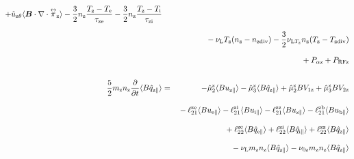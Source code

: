 \documentclass[11pt]{article}
\def\bvec#1{\leavevmode\hbox{\boldmath$#1$}}
\let\vec=\bvec
\def\r#1{{\rm#1}}
\def\aves#1{\langle#1\rangle}
\def\tensor#1{\mathord{\displaystyle\mathop{#1}^\leftrightarrow}}
\def\para{\parallel}
\def\ddt{\frac{\partial}{\partial t}}
\def\mz{m_\r{z}}
\def\nz{n_\r{z}}
\def\Te{T_\r{e}}
\def\Ti{T_\r{i}}
\def\Tz{T_\r{z}}
\def\upara#1{u_{\r{#1}\para}}
\def\uhatth#1{\hat{u}_{\r{#1}\theta}}
\def\qhatpara#1{\hat{q}_{\r{#1}\para}}
\def\nun#1{\nu_\r{0#1}}
\def\ndiv#1{n_\r{#1div}}
\def\Tdiv#1{T_\r{#1div}}
\def\nuLT#1{\nu_{\r{L}T_\r{#1}}}
\def\PRF#1{P_\r{RF#1}}
\def\Palp#1{P_{\alpha\r{#1}}}
\def\nuL{\nu_\r{L}}
\begin{document}
\begin{eqnarray}
%
  + \uhatth{z} \aves{\vec{B}\cdot\nabla\cdot\tensor{\pi}_\r{z}}
%
  - \frac{3}{2} \nz \frac{ \Tz - \Te }{\tau_\r{ze}}
  - \frac{3}{2} \nz \frac{ \Tz - \Ti }{\tau_\r{zi}}
\nonumber\\[2.5mm]&&{}
%
  - \nuL \Tz (\nz - \ndiv{z})
%
  - \frac{3}{2} \nuLT{z} \nz (\Tz - \Tdiv{z})
\nonumber\\[2.5mm]&&{}
%
  + \Palp{z}
%
  + \PRF{z}
\\[5mm]
 \frac{5}{2} \mz \nz \ddt \aves{B \qhatpara{z}} &=&
%
  - \hat{\mu}_2^\r{z} \aves{B \upara{z}} 
  - \hat{\mu}_3^\r{z} \aves{B \qhatpara{z}}
%
  + \hat{\mu}_2^\r{z} {B V_{1\r{z}}} 
  + \hat{\mu}_3^\r{z} {B V_{2\r{z}}}
\nonumber\\[3mm]&&{}
%
  - \ell_{21}^{\r{ze}} \aves{B \upara{e}}
  - \ell_{21}^{\r{zi}} \aves{B \upara{i}}
  - \ell_{21}^{\r{zz}} \aves{B \upara{z}}
  - \ell_{21}^{\r{zb}} \aves{B \upara{b}}
\nonumber\\[3mm]&&{}
%
  + \ell_{22}^{\r{ze}} \aves{B \qhatpara{e}}
  + \ell_{22}^{\r{zi}} \aves{B \qhatpara{i}}
  + \ell_{22}^{\r{zz}} \aves{B \qhatpara{z}}
\nonumber\\[3mm]&&{}
%
  - \nuL \mz \nz \aves{B \qhatpara{z}}
%
  - \nun{z} \mz \nz \aves{B \qhatpara{z}}
\end{eqnarray}
%
\end{document}
